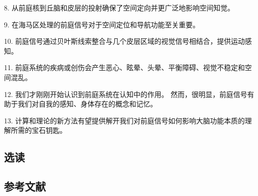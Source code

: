 8. 从前庭核到丘脑和皮层的投射确保了空间定向并更广泛地影响空间知觉。 

9. 在海马区处理的前庭信号对于空间定位和导航功能至关重要。 

10. 前庭信号通过贝叶斯线索整合与几个皮层区域的视觉信号相结合，提供运动感知。 

11. 前庭系统的疾病或创伤会产生恶心、眩晕、头晕、平衡障碍、视觉不稳定和空间混乱。 

12. 我们才刚刚开始认识到前庭系统在认知中的作用。 然而，很明显，前庭信号有助于我们对自我的感知、身体存在的概念和记忆。 

13. 计算和理论的新方法有望提供解开我们对前庭信号如何影响大脑功能本质的理解所需的宝石钥匙。
\subsection{选读}
\subsection{参考文献}

